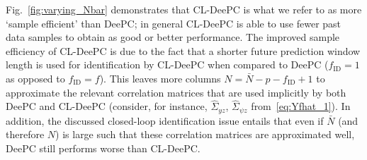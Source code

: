 Fig.~\ref{fig:varying_Nbar} demonstrates that \ac{CL-DeePC} is what we refer to as more `sample efficient' than \ac{DeePC}; in general \ac{CL-DeePC} is able to use fewer past data samples to obtain as good or better performance. The improved sample efficiency of \ac{CL-DeePC} is due to the fact that a shorter future prediction window length is used for identification by \ac{CL-DeePC} when compared to \ac{DeePC} ($f_\mathrm{ID}=1$ as opposed to $f_\mathrm{ID}=f$). This leaves more columns $N=\bar{N}-p-f_\mathrm{ID}+1$ to approximate the relevant correlation matrices that are used implicitly by both \ac{DeePC} and \ac{CL-DeePC} (consider, for instance, $\hat{\Sigma}_{yz}$, $\hat{\Sigma}_{\psi z}$ from~\eqref{eq:Yfhat_1}). In addition, the discussed closed-loop identification issue entails that even if $\bar{N}$ (and therefore $N$) is large such that these correlation matrices are approximated well, \ac{DeePC} still performs worse than \ac{CL-DeePC}.

